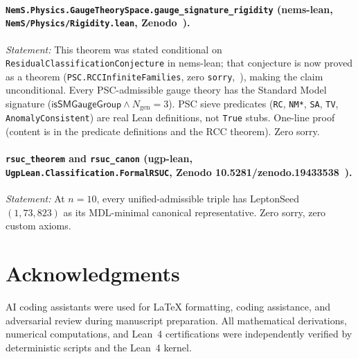 \documentclass[11pt,twocolumn]{article}
\theoremstyle{remark}
\begin{document}
\paragraph{\texttt{NemS.Physics.GaugeTheorySpace.\allowbreak{}gauge\_\allowbreak{}signature\_\allowbreak{}rigidity}
(nems-lean, \texttt{NemS/Physics/\allowbreak{}Rigidity.lean},
Zenodo~\cite{SpivackGaugeRigidity}).}
\textit{Statement:} This theorem was stated conditional on \texttt{ResidualClassificationConjecture}
in nems-lean; that conjecture is now proved as a theorem (\texttt{PSC.RCCInfiniteFamilies}, zero \texttt{sorry},~\cite{ugp-lean}), making the claim unconditional. Every
PSC-admissible gauge theory has the Standard Model signature
($\mathsf{isSMGaugeGroup}\wedge N_{\mathrm{gen}}=3$).
PSC sieve predicates (\texttt{RC}, \texttt{NM*}, \texttt{SA},
\texttt{TV}, \texttt{AnomalyConsistent}) are real Lean definitions,
not \texttt{True} stubs.
One-line proof (content is in the predicate definitions and the
RCC theorem). Zero sorry.

\paragraph{\texttt{rsuc\_theorem} and \texttt{rsuc\_canon}
(ugp-lean, \texttt{UgpLean.Classification.FormalRSUC},
Zenodo 10.5281/\allowbreak zenodo.19433538~\cite{SpivackUGPFormalization}).}
\textit{Statement:} At $n=10$, every unified-admissible triple has
LeptonSeed $(1,73,823)$ as its MDL-minimal canonical representative.
Zero sorry, zero custom axioms.





\section*{Acknowledgments}

AI coding assistants were used for LaTeX formatting, coding assistance, and adversarial review during manuscript preparation. All mathematical derivations, numerical computations, and Lean~4 certifications were independently verified by deterministic scripts and the Lean~4 kernel.
\end{document}
